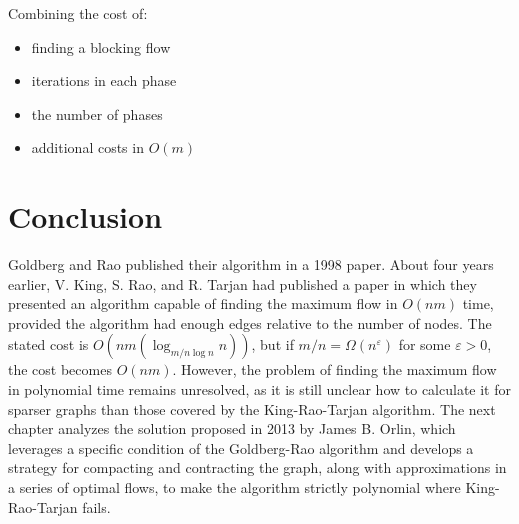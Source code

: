     Combining the cost of:
    \begin{itemize}[label=$\times$]
        \item finding a blocking flow
        \item iterations in each phase
        \item the number of phases
        \item additional costs in \( O(m) \)
    \end{itemize}
    
    \section*{Conclusion}
    Goldberg and Rao published their algorithm in a 1998 paper. About four years earlier, V. King, S. Rao, and R. Tarjan had published a paper in which they presented an algorithm capable of finding the maximum flow in \( O(nm) \) time, provided the algorithm had enough edges relative to the number of nodes.  
    The stated cost is \( O(nm(\log_{m/n \log n} n)) \), but if \( m/n = \Omega(n^\varepsilon) \) for some \( \varepsilon > 0 \), the cost becomes \( O(nm) \).  
    However, the problem of finding the maximum flow in polynomial time remains unresolved, as it is still unclear how to calculate it for sparser graphs than those covered by the King-Rao-Tarjan\cite{kingRaoTarjan} algorithm.  
    The next chapter analyzes the solution proposed in 2013 by James B. Orlin\cite{Orlin}, which leverages a specific condition of the Goldberg-Rao algorithm and develops a strategy for compacting and contracting the graph, along with approximations in a series of optimal flows, to make the algorithm strictly polynomial where King-Rao-Tarjan fails.
\cleardoublepage
